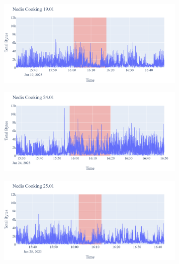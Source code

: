 \begin{figure}[H]
\begin{subfigure}[b]{0.47\textwidth}
    \end{subfigure}
    \begin{subfigure}[b]{0.47\textwidth}
        \centering
        \includegraphics[width=1.2\hsize]{figures/Nedis_Cooking_Bytes_19.01.png}
    \end{subfigure}
    \begin{subfigure}[b]{0.47\textwidth}
        \centering
        \includegraphics[width=1.2\hsize]{figures/Nedis_Cooking_Bytes_24.01.png}
    \end{subfigure}
    \begin{subfigure}[b]{0.47\textwidth}
        \centering
        \includegraphics[width=1.2\hsize]{figures/Nedis_Cooking_Bytes_25.01.png}
    \end{subfigure}
    \begin{subfigure}[b]{0.47\textwidth}

\end{subfigure}
\end{figure}
